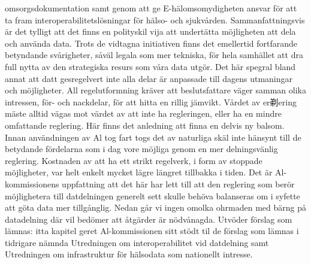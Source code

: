 {{{{{{{{{{{{{{{{{{{omsorgsdokumentation samt genom att ge E-hälomsomydigheten ansvar för att ta fram interoperabilitetslösningar för hälso- och sjukvården.
Sammanfattningsvis är det tylligt att det finns en polityskil vija att undertätta möjligheten att dela och använda data. Trots de vidtagna initiativen finns det emellertid fortfarande betyndande svårigheter, såväl legala som mer tekniska, för hela samhället att dra full nytta av den strategiska resurs som våra data utgör. Det här spegral bland annat att datt gesregelvert inte alla delar är anpassade till dagens utmaningar och möjligheter. All regelutformning kräver att beslutsfattare väger samman olika intressen, för- och nackdelar, för att hitta en rillig jämvikt. Vårdet av er剃ering mäste alltid vägas mot värdet av att inte ha regleringen, eller ha en mindre omfattande reglering. Här finns det anledning att finna en delvis ny balsom.
Innan användningen av Al tog fart togs det av naturliga skäl inte hänsynt till de betydande fördelarna som i dag vore möjliga genom en mer delningsvänlig reglering. Kostnaden av att ha ett strikt regelverk, i form av stoppade möjligheter, var helt enkelt mycket lägre längret tillbakka i tiden. Det är Al-kommissionens uppfattning att det här har lett till att den reglering som berör möjlighetera till datdelningen generelt sett skulle behöva balanseras om i syfette att göta data mer tillgånglig.
Nedan går vi ingen omolka ohrmaden med bärng på datadelning där vil bedömer att åtgärder är nödvånagda. Utvöder förslag som lämnas: itta kapitel geret Al-kommissionen sitt stödt til de förslag som lämnas i tidrigare nämnda Utredningen om interoperabilitet vid datdelning samt Utredningen om infrastruktur för hälsodata som nationellt intresse.
}}}}}}}}}}}}}}}}}}}
